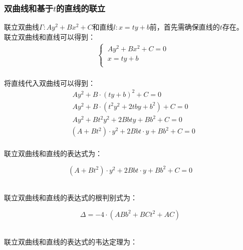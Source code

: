 \documentclass[UTF8]{ctexart}
\begin{document}
\newpage

\subsubsection{双曲线和基于$t$的直线的联立}
    \setcounter{equation}{0}
    联立双曲线$\Gamma:Ay^2+Bx^2+C$和直线$l:x=ty+b$前，首先需确保直线的$t$存在。\\[3mm]
    联立双曲线和直线可以得到：
    \begin{align}
        &\begin{cases}
            ~Ay^2+Bx^2+C=0\\[1mm]
            ~x=ty+b\\[1mm]
        \end{cases}
    \end{align}\\[1mm]
    将直线代入双曲线可以得到：
    \begin{align}
        &~Ay^2+B\cdot(ty+b)^2+C=0\\[5mm]
        &~Ay^2+B\cdot\left(t^2y^2+2tby+b^2\right)+C=0\\[5mm]
        &~Ay^2+Bt^2y^2+2Bbty+Bb^2+C=0\\[5mm]
        &\left(A+Bt^2\right)\cdot y^2+2Bbt\cdot y+Bb^2+C=0
    \end{align}\\
    联立双曲线和直线的表达式为：
    \begin{large}
        \begin{equation*}
            \left(A+Bt^2\right)\cdot y^2+2Bbt\cdot y+Bb^2+C=0
        \end{equation*}
    \end{large}\\
    联立双曲线和直线的表达式的根判别式为：
    \begin{large}
        \begin{equation*}
            \Delta=-4\cdot\left(ABb^2+BCt^2+AC\right)
        \end{equation*}
    \end{large}\\
    联立双曲线和直线的表达式的韦达定理为：\vspace{8pt}
\end{document}
